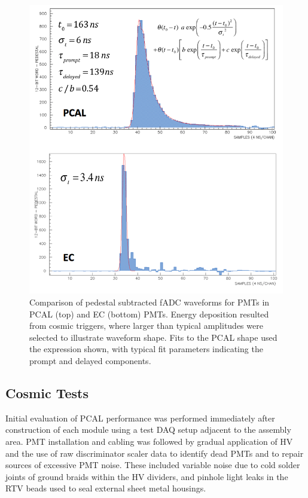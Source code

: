 \begin{figure}[hbt]
\centering
\includegraphics[width=0.95\columnwidth,keepaspectratio]{img/S5_3.png}
\caption{Comparison of pedestal subtracted fADC waveforms for PMTs in PCAL (top) and EC (bottom) PMTs.  Energy deposition resulted from cosmic triggers, where larger than typical amplitudes were selected to illustrate waveform shape. Fits to the PCAL shape used the expression shown, with typical fit parameters indicating the prompt and delayed components.   }
\label{fig:S5_3}
\end{figure}

\subsection{Cosmic Tests}
Initial evaluation of PCAL performance was performed immediately after construction of each module using a test DAQ setup adjacent to the assembly area.  PMT installation and cabling was followed by gradual application of HV and the use of raw discriminator scaler data to identify dead PMTs and to repair sources of excessive PMT noise.  These included variable noise due to cold solder joints of ground braids within the HV dividers, and pinhole light leaks in the RTV beads used to seal external sheet metal housings. 

